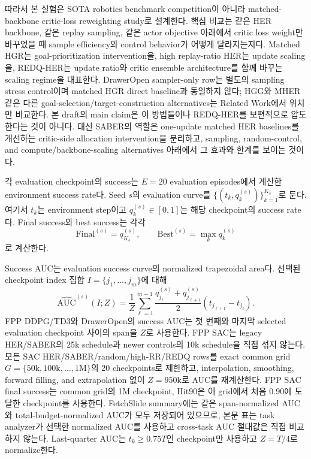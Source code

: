 \documentclass[letterpaper]{article}
\begin{document}
따라서 본 실험은 SOTA robotics benchmark competition이 아니라 matched-backbone critic-loss reweighting study로 설계한다. 핵심 비교는 같은 HER backbone, 같은 replay sampling, 같은 actor objective 아래에서 critic loss weight만 바꾸었을 때 sample efficiency와 control behavior가 어떻게 달라지는지다. Matched HGR는 goal-prioritization intervention을, high replay-ratio HER는 update scaling을, REDQ-HER는 update ratio와 critic ensemble architecture를 함께 바꾸는 scaling regime을 대표한다. DrawerOpen sampler-only row는 별도의 sampling stress control이며 matched HGR direct baseline과 동일하지 않다; HGG와 MHER 같은 다른 goal-selection/target-construction alternatives는 Related Work에서 위치만 비교한다. 본 draft의 main claim은 이 방법들이나 REDQ-HER를 보편적으로 압도한다는 것이 아니다. 대신 SABER의 역할은 one-update matched HER baselines를 개선하는 critic-side allocation intervention을 분리하고, sampling, random-control, and compute/backbone-scaling alternatives 아래에서 그 효과와 한계를 보이는 것이다.

각 evaluation checkpoint의 success는 \(E=20\) evaluation episodes에서 계산한 environment success rate다. Seed \(s\)의 evaluation curve를 \(\{(t_k, q_k^{(s)})\}_{k=1}^{K_s}\)로 둔다. 여기서 \(t_k\)는 environment step이고 \(q_k^{(s)}\in[0,1]\)는 해당 checkpoint의 success rate다. Final success와 best success는 각각
\begin{equation}
\mathrm{Final}^{(s)} = q_{K_s}^{(s)}, \qquad
\mathrm{Best}^{(s)} = \max_k q_k^{(s)}
\end{equation}
로 계산한다.

Success AUC는 evaluation success curve의 normalized trapezoidal area다. 선택된 checkpoint index 집합 \(I=\{j_1,\ldots,j_m\}\)에 대해
\begin{equation}
\widehat{\mathrm{AUC}}^{(s)}(I;Z)
=
\frac{1}{Z}
\sum_{\ell=1}^{m-1}
\frac{q_{j_\ell}^{(s)} + q_{j_{\ell+1}}^{(s)}}{2}
\left(t_{j_{\ell+1}}-t_{j_\ell}\right).
\end{equation}
FPP DDPG/TD3와 DrawerOpen의 success AUC는 첫 번째와 마지막 selected evaluation checkpoint 사이의 span을 \(Z\)로 사용한다. FPP SAC는 legacy HER/SABER의 25k schedule과 newer controls의 10k schedule을 직접 섞지 않는다. 모든 SAC HER/SABER/random/high-RR/REDQ rows를 exact common grid \(G=\{50\mathrm{k},100\mathrm{k},\ldots,1\mathrm{M}\}\)의 20 checkpoints로 제한하고, interpolation, smoothing, forward filling, and extrapolation 없이 \(Z=950\mathrm{k}\)로 AUC를 재계산한다. FPP SAC final success는 common grid의 1M checkpoint, Hit90은 이 grid에서 처음 0.90에 도달한 checkpoint를 사용한다. FetchSlide summary에는 같은 span-normalized AUC와 total-budget-normalized AUC가 모두 저장되어 있으므로, 본문 표는 task analyzer가 선택한 normalized AUC를 사용하고 cross-task AUC 절대값은 직접 비교하지 않는다. Last-quarter AUC는 \(t_k \ge 0.75T\)인 checkpoint만 사용하고 \(Z=T/4\)로 normalize한다.
\end{document}
